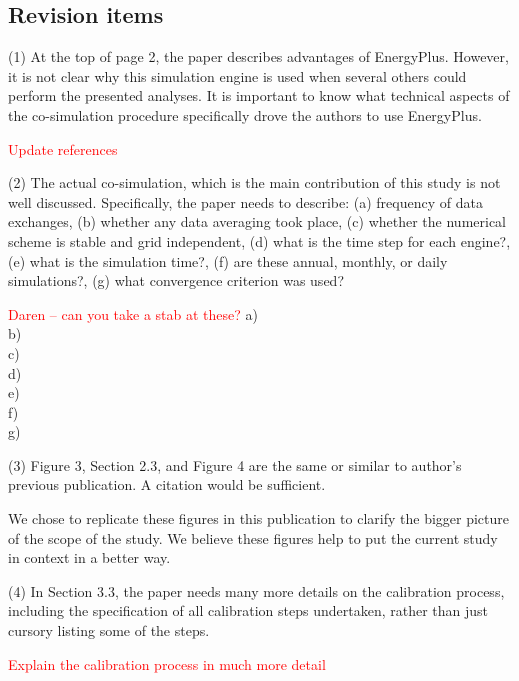 \documentclass[answers,12pt]{exam}
\begin{document}
\begin{questions}
\subsection{Revision items}

\question 
(1) At the top of page 2, the paper describes advantages of EnergyPlus. However, it is not clear why this simulation engine is used when several others could perform the presented analyses. It is important to know what technical aspects of the co-simulation procedure specifically drove the authors to use EnergyPlus. 
\begin{solution}
\textcolor{red}{Update references}

\end{solution}

\question 
(2) The actual co-simulation, which is the main contribution of this study is not well discussed. Specifically, the paper needs to describe: (a) frequency of data exchanges, (b) whether any data averaging took place, (c) whether the numerical scheme is stable and grid independent, (d) what is the time step for each engine?, (e) what is the simulation time?, (f) are these annual, monthly, or daily simulations?, (g) what convergence criterion was used? 
\begin{solution}
\textcolor{red}{Daren -- can you take a stab at these?}
a) \\
b) \\
c) \\
d) \\
e) \\
f) \\
g) \\
\end{solution}

\question 
(3) Figure 3, Section 2.3, and Figure 4 are the same or similar to author’s previous publication. A citation would be sufficient. 
\begin{solution}
We chose to replicate these figures in this publication to clarify the bigger picture of the scope of the study. We believe these figures help to put the current study in context in a better way.
\end{solution}

\question 
(4) In Section 3.3, the paper needs many more details on the calibration process, including the specification of all calibration steps undertaken, rather than just cursory listing some of the steps. 
\begin{solution}
\textcolor{red}{Explain the calibration process in much more detail}
\end{solution}


\end{questions}
\end{document}
